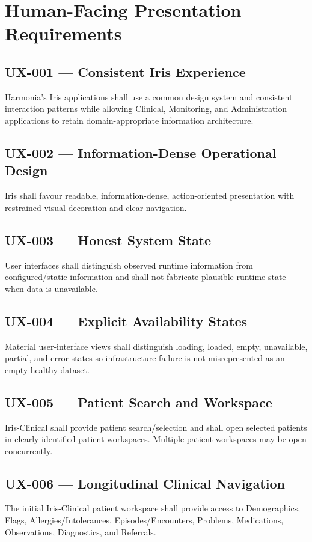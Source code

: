 \section{Human-Facing Presentation Requirements}

\subsection{UX-001 --- Consistent Iris Experience}
Harmonia's Iris applications shall use a common design system and consistent interaction patterns while allowing Clinical, Monitoring, and Administration applications to retain domain-appropriate information architecture.

\subsection{UX-002 --- Information-Dense Operational Design}
Iris shall favour readable, information-dense, action-oriented presentation with restrained visual decoration and clear navigation.

\subsection{UX-003 --- Honest System State}
User interfaces shall distinguish observed runtime information from configured/static information and shall not fabricate plausible runtime state when data is unavailable.

\subsection{UX-004 --- Explicit Availability States}
Material user-interface views shall distinguish loading, loaded, empty, unavailable, partial, and error states so infrastructure failure is not misrepresented as an empty healthy dataset.

\subsection{UX-005 --- Patient Search and Workspace}
Iris-Clinical shall provide patient search/selection and shall open selected patients in clearly identified patient workspaces. Multiple patient workspaces may be open concurrently.

\subsection{UX-006 --- Longitudinal Clinical Navigation}
The initial Iris-Clinical patient workspace shall provide access to Demographics, Flags, Allergies/Intolerances, Episodes/Encounters, Problems, Medications, Observations, Diagnostics, and Referrals.

